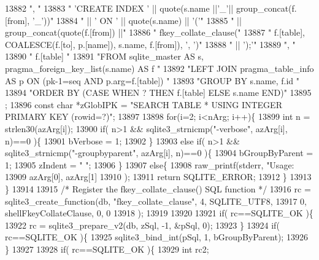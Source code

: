 \begin{DoxyCode}
13882     \textcolor{stringliteral}{", "}
13883     \textcolor{stringliteral}{"     'CREATE INDEX ' || quote(s.name ||'\_'|| group\_concat(f.[from], '\_'))"}
13884     \textcolor{stringliteral}{"  || ' ON ' || quote(s.name) || '('"}
13885     \textcolor{stringliteral}{"  || group\_concat(quote(f.[from]) ||"}
13886     \textcolor{stringliteral}{"        fkey\_collate\_clause("}
13887     \textcolor{stringliteral}{"          f.[table], COALESCE(f.[to], p.[name]), s.name, f.[from]), ', ')"}
13888     \textcolor{stringliteral}{"  || ');'"}
13889     \textcolor{stringliteral}{", "}
13890     \textcolor{stringliteral}{"     f.[table] "}
13891     \textcolor{stringliteral}{"FROM sqlite\_master AS s, pragma\_foreign\_key\_list(s.name) AS f "}
13892     \textcolor{stringliteral}{"LEFT JOIN pragma\_table\_info AS p ON (pk-1=seq AND p.arg=f.[table]) "}
13893     \textcolor{stringliteral}{"GROUP BY s.name, f.id "}
13894     \textcolor{stringliteral}{"ORDER BY (CASE WHEN ? THEN f.[table] ELSE s.name END)"}
13895   ;
13896   \textcolor{keyword}{const} \textcolor{keywordtype}{char} *zGlobIPK = \textcolor{stringliteral}{"SEARCH TABLE * USING INTEGER PRIMARY KEY (rowid=?)"};
13897 
13898   \textcolor{keywordflow}{for}(i=2; i<nArg; i++)\{
13899     \textcolor{keywordtype}{int} n = strlen30(azArg[i]);
13900     \textcolor{keywordflow}{if}( n>1 && sqlite3_strnicmp(\textcolor{stringliteral}{"-verbose"}, azArg[i], n)==0 )\{
13901       bVerbose = 1;
13902     \}
13903     \textcolor{keywordflow}{else} \textcolor{keywordflow}{if}( n>1 && sqlite3_strnicmp(\textcolor{stringliteral}{"-groupbyparent"}, azArg[i], n)==0 )\{
13904       bGroupByParent = 1;
13905       zIndent = \textcolor{stringliteral}{"    "};
13906     \}
13907     \textcolor{keywordflow}{else}\{
13908       raw_printf(stderr, \textcolor{stringliteral}{"Usage: %
13909           azArg[0], azArg[1]
13910       );
13911       \textcolor{keywordflow}{return} SQLITE_ERROR;
13912     \}
13913   \}
13914 
13915   \textcolor{comment}{/* Register the fkey\_collate\_clause() SQL function */}
13916   rc = sqlite3_create_function(db, \textcolor{stringliteral}{"fkey\_collate\_clause"}, 4, SQLITE_UTF8,
13917       0, shellFkeyCollateClause, 0, 0
13918   );
13919 
13920 
13921   \textcolor{keywordflow}{if}( rc==SQLITE_OK )\{
13922     rc = sqlite3_prepare_v2(db, zSql, -1, &pSql, 0);
13923   \}
13924   \textcolor{keywordflow}{if}( rc==SQLITE_OK )\{
13925     sqlite3_bind_int(pSql, 1, bGroupByParent);
13926   \}
13927 
13928   \textcolor{keywordflow}{if}( rc==SQLITE_OK )\{
13929     \textcolor{keywordtype}{int} rc2;
}
\end{DoxyCode}
